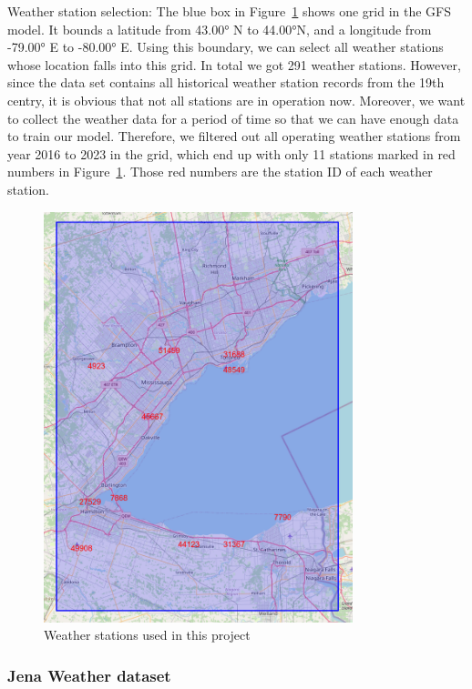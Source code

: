 \documentclass[12pt]{article}
\begin{document}
Weather station selection: The blue box in Figure~\ref{Fig:stations} shows one grid in the GFS model. It bounds a latitude from \ang{43.00} N to \ang{44.00}N, and a longitude from \ang{-79.00} E to \ang{-80.00} E. Using this boundary, we can select all weather stations whose location falls into this grid. In total we got 291 weather stations. However, since the data set contains all historical weather station records from the 19th centry, it is obvious that not all stations are in operation now. Moreover, we want to collect the weather data for a period of time so that we can have enough data to train our model. Therefore, we filtered out all operating weather stations from year 2016 to 2023 in the grid, which end up with only 11 stations marked in red numbers in Figure~\ref{Fig:stations}. Those red numbers are the station ID of each weather station.

\begin{figure}[htpb]
	\centering
	\includegraphics[width=0.8\textwidth]{pic/stations-ID.png}
	\caption{Weather stations used in this project}
	\label{Fig:stations}
\end{figure}

\subsubsection{Jena Weather dataset}
\end{document}
